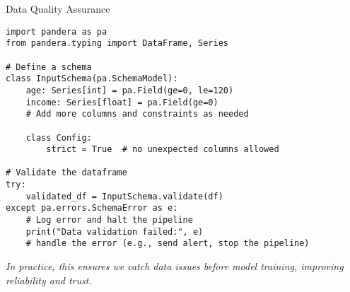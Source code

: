 \documentclass[aspectratio=169]{beamer}
\begin{document}
%
%
\begin{frame}{Data Quality Assurance}
\begin{verbatim}
import pandera as pa
from pandera.typing import DataFrame, Series

# Define a schema
class InputSchema(pa.SchemaModel):
    age: Series[int] = pa.Field(ge=0, le=120)
    income: Series[float] = pa.Field(ge=0)
    # Add more columns and constraints as needed

    class Config:
        strict = True  # no unexpected columns allowed

# Validate the dataframe
try:
    validated_df = InputSchema.validate(df)
except pa.errors.SchemaError as e:
    # Log error and halt the pipeline
    print("Data validation failed:", e)
    # handle the error (e.g., send alert, stop the pipeline)
\end{verbatim}

\vspace{0.8em}
\emph{In practice, this ensures we catch data issues before model training, improving reliability and trust.}
\end{frame}
\end{document}
